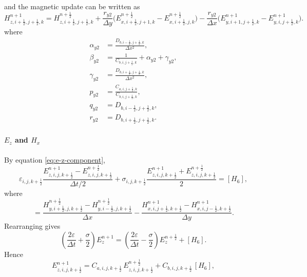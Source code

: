 \documentclass{article}
\numberwithin{equation}{section}
\numberwithin{figure}{section}
\begin{document}
and the magnetic update can be written as
\begin{equation}
    H_{z,i+\tfrac12,j+\tfrac12,k}^{n+1} = H_{z,i+\tfrac12,j+\tfrac12,k}^{n+\frac12} + \frac{r_{y2}}{\Delta y}\Big(E_{x,i+\tfrac12,j+1,k}^{n+\frac12}-E_{x,i+\tfrac12,j,k}^{n+\frac12}\Big) - \frac{r_{y2}}{\Delta x}\Big(E_{y,i+1,j+\tfrac12,k}^{n+1}-E_{y,i,j+\tfrac12,k}^{n+1}\Big).
    \label{eq:adi-second-hz}
\end{equation}
where
\begin{align}
    \alpha_{y2} & =\frac{D_{b,i-\tfrac12,j+\tfrac12,k}}{\Delta x^2},       \\
    \beta_{y2}  & =\frac{1}{C_{b,i,j+\tfrac12,k}}+\alpha_{y2}+\gamma_{y2}, \\
    \gamma_{y2} & =\frac{D_{b,i+\tfrac12,j+\tfrac12,k}}{\Delta x^2},       \\
    p_{y2}      & =\frac{C_{a,i,j+\tfrac12,k}}{C_{b,i,j+\tfrac12,k}},      \\
    q_{y2}      & =D_{b,i-\tfrac12,j+\tfrac12,k},                          \\
    r_{y2}      & =D_{b,i+\tfrac12,j+\tfrac12,k}.
\end{align}

\paragraph{$E_z$ and $H_x$}
By equation \eqref{eq:e-z-component},
\begin{equation}
    \varepsilon_{i,j,k+\tfrac12} \frac{E_{z,i,j,k+\tfrac12}^{n+1}-E_{z,i,j,k+\tfrac12}^{n+\frac12}}{\Delta t/2} + \sigma_{i,j,k+\tfrac12} \frac{E_{z,i,j,k+\tfrac12}^{n+1}+E_{z,i,j,k+\tfrac12}^{n+\frac12}}{2} = [H_6],
    \label{eq:second-e-ez}
\end{equation}
where
\begin{equation}
    [H_6] = \frac{H_{y,i+\tfrac12,j,k+\tfrac12}^{n+\frac12}-H_{y,i-\tfrac12,j,k+\tfrac12}^{n+\frac12}}{\Delta x} - \frac{H_{x,i,j+\tfrac12,k+\tfrac12}^{n+1}-H_{x,i,j-\tfrac12,k+\tfrac12}^{n+1}}{\Delta y}.
\end{equation}
Rearranging gives
\begin{equation}
    \left(\frac{2\varepsilon}{\Delta t}+\frac{\sigma}{2}\right) E_{z}^{n+1} = \left(\frac{2\varepsilon}{\Delta t}-\frac{\sigma}{2}\right) E_{z}^{n+\frac12} + [H_6].
\end{equation}
Hence
\begin{equation}
    E_{z,i,j,k+\tfrac12}^{n+1} = C_{a,i,j,k+\tfrac12}\,E_{z,i,j,k+\tfrac12}^{n+\frac12} + C_{b,i,j,k+\tfrac12}\,[H_6],
    \label{eq:second-e-ez-adi}
\end{equation}
\end{document}
